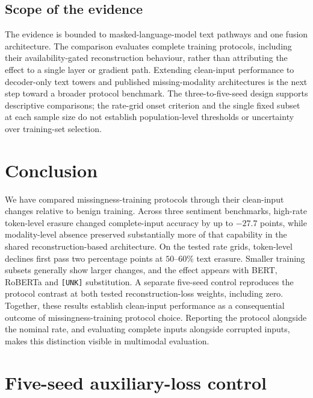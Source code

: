 \documentclass[preprint,11pt]{elsarticle}
\newcommand{\tokenlevel}{token-level}
\newcommand{\modlevel}{modality-level}
\begin{document}
\subsection{Scope of the evidence}

The evidence is bounded to masked-language-model text pathways and one fusion
architecture. The comparison evaluates complete training protocols, including
their availability-gated reconstruction behaviour, rather than attributing the
effect to a single layer or gradient path. Extending clean-input performance to
decoder-only text towers and published missing-modality architectures is the
next step toward a broader protocol benchmark. The three-to-five-seed design
supports descriptive comparisons; the rate-grid onset criterion and the
single fixed subset at each sample size do not establish population-level
thresholds or uncertainty over training-set selection.

\section{Conclusion}\label{sec:conclusion}

We have compared missingness-training protocols through their clean-input
changes relative to benign training. Across three sentiment benchmarks,
high-rate \tokenlevel{} erasure changed complete-input accuracy by up to
$-27.7$ points, while \modlevel{} absence preserved substantially more of that
capability in the shared reconstruction-based architecture. On the tested rate
grids, token-level declines first pass two percentage points at $50$--$60\%$
text erasure. Smaller training subsets generally show larger changes, and the
effect appears with BERT, RoBERTa and \texttt{[UNK]} substitution. A separate
five-seed control reproduces the protocol contrast at both tested
reconstruction-loss weights, including zero. Together,
these results establish clean-input performance as a consequential outcome of
missingness-training protocol choice. Reporting the protocol alongside the
nominal rate, and evaluating complete inputs alongside corrupted inputs,
makes this distinction visible in multimodal evaluation.

\clearpage
\appendix
\setcounter{table}{0}
\section{Five-seed auxiliary-loss control}\label{sec:control_cuda}
\end{document}
